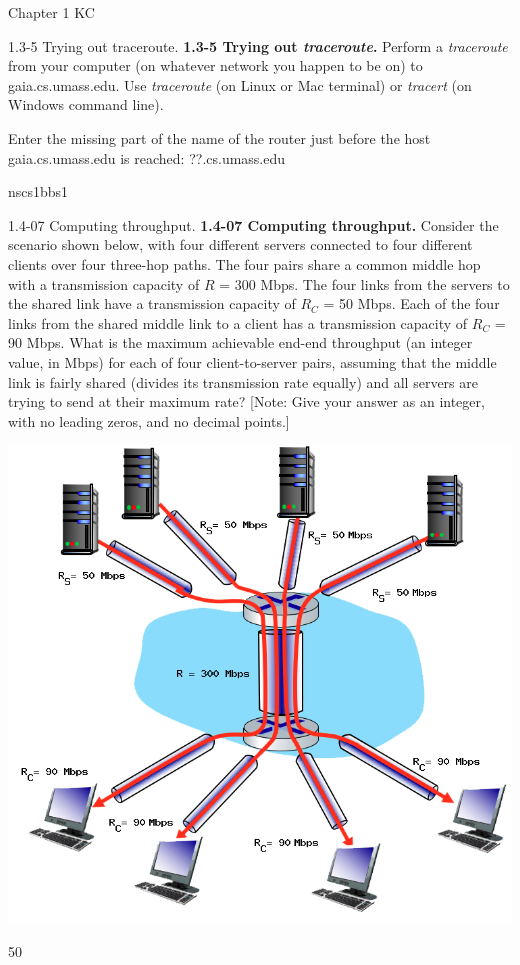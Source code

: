 \documentclass[a4paper]{article}
\begin{document}
\begin{quiz}{Chapter 1 KC}
\begin{shortanswer}[points=1]{1.3-5 Trying out traceroute.}
\textbf{1.3-5 Trying out \textit{traceroute}.} 
Perform a \textit{traceroute} from your computer (on whatever network you happen to be on) to gaia.cs.umass.edu. Use \textit{traceroute} (on Linux or Mac terminal) or \textit{tracert} (on Windows command line). 

Enter the missing part of the name of the router just before the host gaia.cs.umass.edu is reached: ??.cs.umass.edu
\item* nscs1bbs1
\end{shortanswer}

\begin{shortanswer}[points=1]{1.4-07 Computing throughput.}
\textbf{1.4-07 Computing throughput.} 
Consider the scenario shown below, with four different servers connected to four different clients over four three-hop paths. The four pairs share a common middle hop with a transmission capacity of $R$ = 300 Mbps. The four links from the servers to the shared link have a transmission capacity of $R_C$ = 50 Mbps. Each of the four links from the shared middle link to a client has a transmission capacity of $R_C$ = 90 Mbps. What is the maximum achievable end-end throughput (an integer value, in Mbps) for each of four client-to-server pairs, assuming that the middle link is fairly shared (divides its transmission rate equally) and all servers are trying to send at their maximum rate? 
[Note: Give your answer as an integer, with no leading zeros, and no decimal points.] 
\begin{center}
\includegraphics[width=\linewidth]{figs/1.4.7.png}
\end{center}
\item* 50
\end{shortanswer}


\end{quiz}
\end{document}
